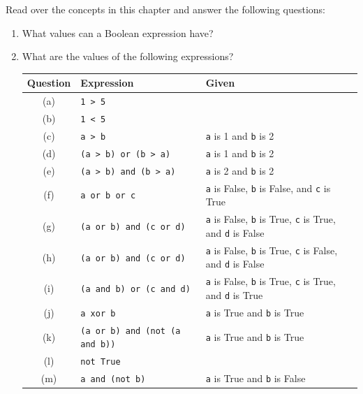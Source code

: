 Read over the concepts in this chapter and answer the following questions:
\begin{enumerate}
  \item What values can a Boolean expression have?
  \item What are the values of the following expressions?
  
  \begin{table}[h]
    \centering
    \begin{tabular}{|c|l|l|}
      \hline
      \textbf{Question} & \textbf{Expression} & \textbf{Given} \\
      \hline
      (a) & \texttt{1 > 5} & \\
      \hline
      (b) & \texttt{1 < 5} & \\
      \hline
      (c) & \texttt{a > b} & \texttt{a} is 1 and \texttt{b} is 2 \\
      \hline
      (d) & \texttt{(a > b) or (b > a)} & \texttt{a} is 1 and \texttt{b} is 2 \\
      \hline
      (e) & \texttt{(a > b) and (b > a)} & \texttt{a} is 2 and \texttt{b} is 2 \\
      \hline
      (f) & \texttt{a or b or c} & \texttt{a} is False, \texttt{b} is False, and \texttt{c} is True\\
      \hline
      (g) & \texttt{(a or b) and (c or d)} & \texttt{a} is False, \texttt{b} is True, \texttt{c} is True, and \texttt{d} is False \\
      \hline
      (h) & \texttt{(a or b) and (c or d)} & \texttt{a} is False, \texttt{b} is True, \texttt{c} is False, and \texttt{d} is False \\
      \hline
      (i) & \texttt{(a and b) or (c and d)} & \texttt{a} is False, \texttt{b} is True, \texttt{c} is True, and \texttt{d} is True \\
      \hline
      (j) & \texttt{a xor b} & \texttt{a} is True and \texttt{b} is True\\
      \hline
      (k) & \texttt{(a or b) and (not (a and b))} & \texttt{a} is True and \texttt{b} is True\\
      \hline
      (l) & \texttt{not True} & \\
      \hline
      (m) & \texttt{a and (not b)} & \texttt{a} is True and \texttt{b} is False\\
      \hline
    \end{tabular}    
  \end{table}
  

\end{enumerate}
